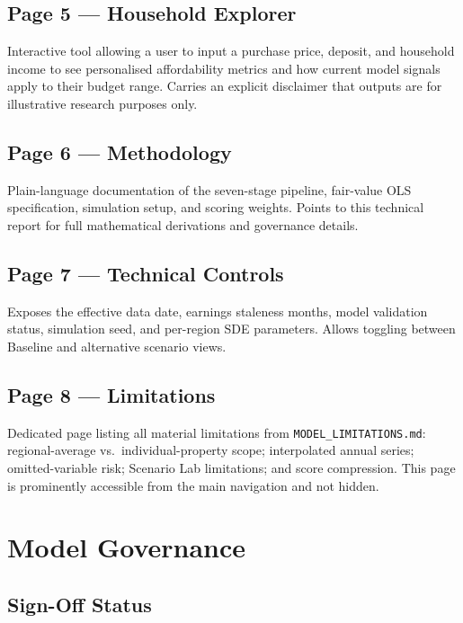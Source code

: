\documentclass[11pt,a4paper]{article}
\theoremstyle{plain}
\theoremstyle{definition}
\begin{document}
\subsection{Page 5 --- Household Explorer}

Interactive tool allowing a user to input a purchase price, deposit, and
household income to see personalised affordability metrics and how current
model signals apply to their budget range.  Carries an explicit disclaimer
that outputs are for illustrative research purposes only.

\subsection{Page 6 --- Methodology}

Plain-language documentation of the seven-stage pipeline, fair-value OLS
specification, simulation setup, and scoring weights.  Points to this
technical report for full mathematical derivations and governance details.

\subsection{Page 7 --- Technical Controls}

Exposes the effective data date, earnings staleness months, model
validation status, simulation seed, and per-region SDE parameters.
Allows toggling between Baseline and alternative scenario views.

\subsection{Page 8 --- Limitations}

Dedicated page listing all material limitations from
\texttt{MODEL\_LIMITATIONS.md}: regional-average vs.\ individual-property
scope; interpolated annual series; omitted-variable risk; Scenario Lab
limitations; and score compression.  This page is prominently accessible
from the main navigation and not hidden.

\section{Model Governance}

\subsection{Sign-Off Status}
\end{document}

